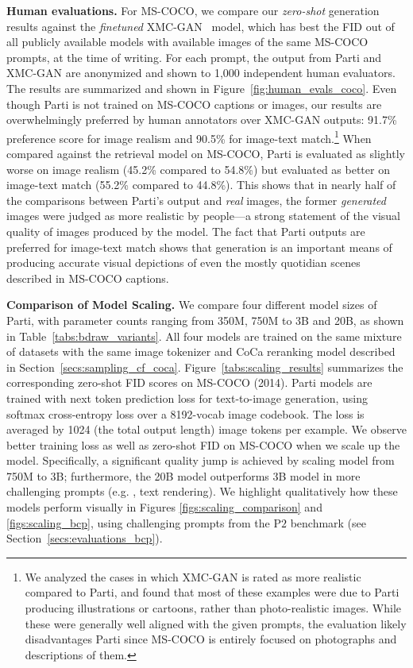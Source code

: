 \textbf{Human evaluations.} For MS-COCO, we compare our \textit{zero-shot} generation results against the \textit{finetuned} XMC-GAN~\cite{zhang2021cross} model, which has best the FID out of all publicly available models with available images of the same MS-COCO prompts, at the time of writing. For each prompt, the output from Parti and XMC-GAN are anonymized and shown to 1,000 independent human evaluators. The results are summarized and shown in Figure~\ref{fig:human_evals_coco}.  Even though Parti is not trained on MS-COCO captions or images, our results are overwhelmingly preferred by human annotators over XMC-GAN outputs: 91.7\% preference score for image realism and 90.5\% for image-text match.\footnote{We analyzed the cases in which XMC-GAN is rated as more realistic compared to Parti, and found that most of these examples were due to Parti producing illustrations or cartoons, rather than photo-realistic images. While these were generally well aligned with the given prompts, the evaluation likely disadvantages Parti since MS-COCO is entirely focused on photographs and descriptions of them.} When compared against the retrieval model on MS-COCO, Parti is evaluated as slightly worse on image realism (45.2\% compared to 54.8\%)
but evaluated as better on image-text match (55.2\% compared to 44.8\%). This shows that in nearly half of the comparisons between Parti's output and \textit{real} images, the former \textit{generated} images were judged as more realistic by people---a strong statement of the visual quality of images produced by the model. The fact that Parti outputs are preferred for image-text match shows that generation is an important means of producing accurate visual depictions of even the mostly quotidian scenes described in MS-COCO captions.

\textbf{Comparison of Model Scaling.} We compare four different model sizes of Parti, with parameter counts ranging from 350M, 750M to 3B and 20B, as shown in Table~\ref{tabs:bdraw_variants}. All four models are trained on the same mixture of datasets with the same image tokenizer and CoCa reranking model described in Section~\ref{secs:sampling_cf_coca}. 
Figure~\ref{tabs:scaling_results} summarizes the corresponding zero-shot FID scores on MS-COCO (2014). Parti models are trained with next token prediction loss for text-to-image generation, using softmax cross-entropy loss over a 8192-vocab image codebook. The loss is averaged by 1024 (the total output length) image tokens per example. We observe better training loss as well as zero-shot FID on MS-COCO when we scale up the model. Specifically, a significant quality jump is achieved by scaling model from 750M to 3B; furthermore, the 20B model outperforms 3B model in more challenging prompts (e.g. , text rendering). We highlight qualitatively how these models perform visually in Figures \ref{figs:scaling_comparison} and \ref{figs:scaling_bcp}, using challenging prompts from the P$2$ benchmark (see Section~\ref{secs:evaluations_bcp}).

